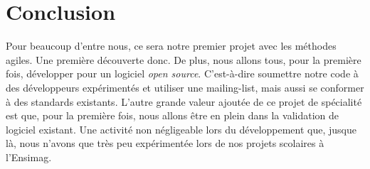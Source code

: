 \documentclass[11pt]{article}
\begin{document}
\section{Conclusion}
Pour beaucoup d'entre nous, ce sera notre premier projet avec les méthodes agiles. Une première découverte donc. De plus, nous allons tous, pour la première fois, développer pour un logiciel \textit{open source}. C'est-à-dire soumettre notre code à des développeurs expérimentés et utiliser une mailing-list, mais aussi se conformer à des standards existants. L'autre grande valeur ajoutée de ce projet de spécialité est que, pour la première fois, nous allons être en plein dans la validation de logiciel existant. Une activité non négligeable lors du développement que, jusque là, nous n'avons que très peu expérimentée lors de nos projets scolaires à l'Ensimag. 
\end{document}

